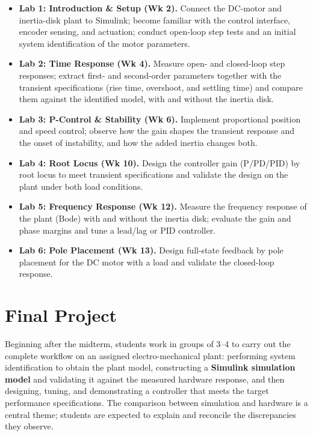 \documentclass[11pt]{article}
\begin{document}
\begin{itemize}
    \item \textbf{Lab 1: Introduction \& Setup (Wk 2).} Connect the DC-motor and
          inertia-disk plant to Simulink; become familiar with the control interface,
          encoder sensing, and actuation; conduct open-loop step tests and an initial
          system identification of the motor parameters.
    \item \textbf{Lab 2: Time Response (Wk 4).} Measure open- and closed-loop step
          responses; extract first- and second-order parameters together with the
          transient specifications (rise time, overshoot, and settling time) and compare
          them against the identified model, with and without the inertia disk.
    \item \textbf{Lab 3: P-Control \& Stability (Wk 6).} Implement proportional position
          and speed control; observe how the gain shapes the transient response and the
          onset of instability, and how the added inertia changes both.
    \item \textbf{Lab 4: Root Locus (Wk 10).} Design the controller gain (P/PD/PID) by
          root locus to meet transient specifications and validate the design on the
          plant under both load conditions.
    \item \textbf{Lab 5: Frequency Response (Wk 12).} Measure the frequency response of
          the plant (Bode) with and without the inertia disk; evaluate the gain and phase
          margins and tune a lead/lag or PID controller.
    \item \textbf{Lab 6: Pole Placement (Wk 13).} Design full-state feedback by pole
          placement for the DC motor with a load and validate the closed-loop
          response.
\end{itemize}

\newpage
\section{Final Project}
Beginning after the midterm, students work in groups of 3--4 to carry out the
complete workflow on an assigned electro-mechanical plant: performing system
identification to obtain the plant model, constructing a \textbf{Simulink simulation
model} and validating it against the measured hardware response, and then designing,
tuning, and demonstrating a controller that meets the target performance specifications.
The comparison between simulation and hardware is a central theme; students are expected
to explain and reconcile the discrepancies they observe.
\end{document}
